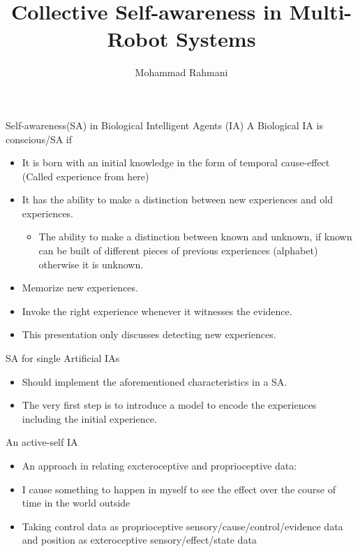 \documentclass[unknownkeysallowed]{beamer}
\title{Collective Self-awareness in Multi-Robot Systems}
\author{Mohammad Rahmani}
\institute{DECIDE Doctoral School}
\begin{document}
\begin{frame}
	\maketitle
\end{frame}

\begin{frame}{Self-awareness(SA) in Biological Intelligent Agents (IA)}
	A Biological IA is conscious/SA if
	\begin{itemize}
		\item It is born with an initial knowledge in the form of temporal cause-effect (Called experience from here)
		\item It has the ability to make a distinction between new experiences and old experiences. 
			\begin{itemize}
				\item The ability to make a distinction between known and unknown, if known can be built of different pieces of previous experiences (alphabet) otherwise it is unknown.
			\end{itemize}
		\item Memorize new experiences.
		\item Invoke the right experience whenever it witnesses the evidence. 
		\item This presentation only discusses detecting new experiences.
	\end{itemize}
\end{frame}


\begin{frame}{SA for single Artificial IAs}
	\begin{itemize}
		\item Should implement the aforementioned characteristics in a SA.
		\item The very first step is to introduce a model to encode the experiences including the initial experience.
	\end{itemize}
\end{frame}

\begin{frame}{An active-self IA}
	\begin{itemize}
		\item An approach in relating excteroceptive and proprioceptive data: 
		\item I cause something to happen in myself to see the effect over the course of time in the world outside
		\item Taking control data as proprioceptive sensory/cause/control/evidence data and position as exteroceptive sensory/effect/state data
	\end{itemize}
\end{frame}
\end{document}
